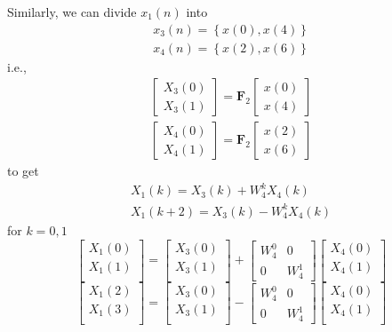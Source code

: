 \documentclass[journal,12pt,twocolumn]{IEEEtran}
\providecommand{\cbrak}[1]{\ensuremath{\left\{#1\right\}}}
\let\vec\mathbf
\numberwithin{equation}{section}
\renewcommand\thesection{\arabic{section}}
\newcommand{\mymat}[1]{\ensuremath{\begin{bmatrix}#1\end{bmatrix}}}
\begin{document}
\begin{enumerate}[label=\thesection.\arabic*]
	Similarly, we can divide $x_1(n)$ into 
	\begin{align}
		x_3(n) = \cbrak{x(0), x(4)} \\
		x_4(n) = \cbrak{x(2), x(6)}
	\end{align}
	i.e.,
	\begin{align}
		\mymat{X_3(0) \\ X_3(1)} = \vec{F}_2 \mymat{x(0) \\ x(4)} \\
		\mymat{X_4(0) \\ X_4(1)} = \vec{F}_2 \mymat{x(2) \\ x(6)}
	\end{align}
	to get
	\begin{align}
		X_1(k) = X_3(k) + W_4^k X_4(k) \\
		X_1(k + 2) = X_3(k) - W_4^k X_4(k) 
	\end{align}
	for $k = 0, 1$
	\begin{equation}
\begin{bmatrix}
X_{1}(0) \\ 
X_{1}(1)\\ 
\end{bmatrix}
=
\begin{bmatrix}
X_{3}(0) \\ 
X_{3}(1)\\ 
\end{bmatrix}
+
\begin{bmatrix}
W^{0}_{4} & 0\\
0 & W^{1}_{4}
\end{bmatrix}
\begin{bmatrix}
X_{4}(0) \\ 
X_{4}(1) \\ 
\end{bmatrix}
\end{equation}
\begin{equation}
\begin{bmatrix}
X_{1}(2) \\ 
X_{1}(3)\\ 
\end{bmatrix}
=
\begin{bmatrix}
X_{3}(0) \\ 
X_{3}(1)\\ 
\end{bmatrix}
-
\begin{bmatrix}
W^{0}_{4} & 0\\
0 & W^{1}_{4}
\end{bmatrix}
\begin{bmatrix}
X_{4}(0) \\ 
X_{4}(1) \\ 
\end{bmatrix}
\end{equation}


\end{enumerate}
\end{document}
